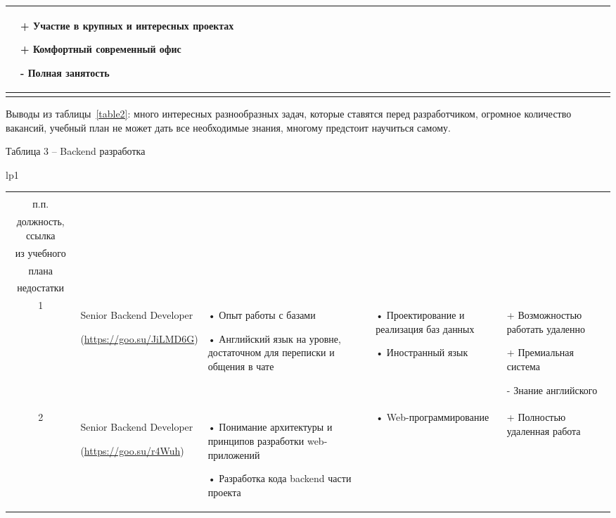 \documentclass[14pt]{extreport}
\begin{document}
\begin{landscape}
\begin{longtable}[H]{lp{1\linewidth}}
\begin{small}
\begin{tabular}{|c|p{}|p{6cm}|p{5cm}|p{5cm}|}
•	Информатика &
+	Участие в крупных и интересных проектах

+	Комфортный современный офис

-	Полная занятость \\


	\hline 


    \end{tabular}
    \end{small}
\end{longtable}
Выводы из таблицы~\ref{table2}: много интересных разнообразных задач, которые ставятся перед разработчиком, огромное количество вакансий, учебный план не может дать все необходимые знания, многому предстоит научиться самому.







\newpage
Таблица 3 – Backend разработка
\begin{longtable}[H]{lp{1\linewidth}}
\caption{Backend разработка \label{table3}}


\centering

\begin{small}


    \begin{tabular}{|c|p{}|p{6cm}|p{5cm}|p{5cm}|}
	\hline 
	\makecell{№ \\ п.п.} &	\makecell{Наименование,\\ должность, ссылка} &	\makecell{Требования} & 	\makecell{Дисциплины \\ из учебного \\плана} &	\makecell{Преимущества и \\недостатки}  \\ 
	\hline 
	1	& Senior Backend Developer 
	
(\url{https://goo.su/JiLMD6G}) &
•	Опыт работы с базами

•	Английский язык на уровне, достаточном для переписки и общения в чате &
•	Проектирование и реализация баз данных

•	Иностранный язык &
+	Возможностью работать удаленно

+	Премиальная система

-	Знание английского \\


	\hline
	2	& Senior Backend Developer
	
(\url{https://goo.su/r4Wuh}) &
•	Понимание архитектуры и принципов разработки web-приложений

•	Разработка кода backend части проекта &
•	Web-программирование &
+	Полностью удаленная работа


\end{tabular}
\end{small}
\end{longtable}
\end{landscape}
\end{document}

